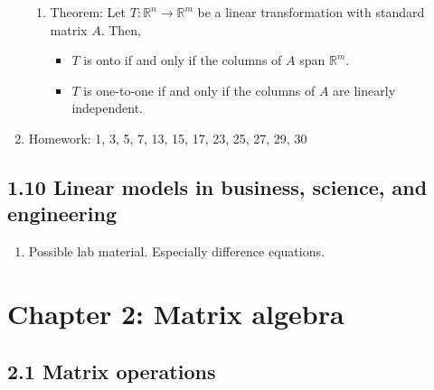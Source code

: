 \documentclass{article}
\begin{document}
\begin{enumerate}
\begin{enumerate}
\item Theorem: Let $T:\mathbb{R}^n \rightarrow \mathbb{R}^m$ be a linear transformation with standard matrix $A$. Then,
\begin{itemize}
\item $T$ is onto if and only if the columns of $A$ span $\mathbb{R}^m$.
\item $T$ is one-to-one if and only if the columns of $A$ are linearly independent.
\end{itemize}

\end{enumerate}

\item Homework: 1, 3, 5, 7, 13, 15, 17, 23, 25, 27, 29, 30

\end{enumerate}

\subsection{1.10 Linear models in business, science, and engineering}

\begin{enumerate}

\item Possible lab material. Especially difference equations.

\end{enumerate}

\section{Chapter 2: Matrix algebra} 

\subsection{2.1 Matrix operations}
\end{document}
